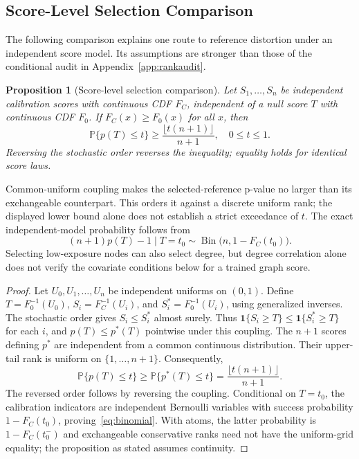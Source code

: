 \documentclass[twoside]{article}
\newtheorem{proposition}{Proposition}
\newcommand{\Prb}{\mathbb{P}}
\newcommand{\ind}{\mathbf{1}}
\begin{document}
\subsection{Score-Level Selection Comparison}
The following comparison explains one route to reference distortion under an independent score model. Its assumptions are stronger than those of the conditional audit in Appendix~\ref{app:rankaudit}.
\begin{proposition}[Score-level selection comparison]
\label{prop:order}
Let $S_1,\ldots,S_n$ be independent calibration scores with continuous CDF $F_C$, independent of a null score $T$ with continuous CDF $F_0$. If $F_C(x)\ge F_0(x)$ for all $x$, then
\begin{equation}
\Prb\{p(T)\le t\}\ge\frac{\lfloor t(n+1)\rfloor}{n+1},\quad 0\le t\le1.
\label{eq:order}
\end{equation}
Reversing the stochastic order reverses the inequality; equality holds for identical score laws.
\end{proposition}
Common-uniform coupling makes the selected-reference p-value no larger than its exchangeable counterpart. This orders it against a discrete uniform rank; the displayed lower bound alone does not establish a strict exceedance of $t$. The exact independent-model probability follows from
\begin{equation}
(n+1)p(T)-1\mid T=t_0\sim\operatorname{Bin}\bigl(n,1-F_C(t_0)\bigr).
\label{eq:binomial}
\end{equation}
Selecting low-exposure nodes can also select degree, but degree correlation alone does not verify the covariate conditions below for a trained graph score.

\begin{proof}
Let $U_0,U_1,\ldots,U_n$ be independent uniforms on $(0,1)$. Define $T=F_0^{-1}(U_0)$, $S_i=F_C^{-1}(U_i)$, and $S_i^*=F_0^{-1}(U_i)$, using generalized inverses. The stochastic order gives $S_i\le S_i^*$ almost surely. Thus $\ind\{S_i\ge T\}\le\ind\{S_i^*\ge T\}$ for each $i$, and $p(T)\le p^*(T)$ pointwise under this coupling. The $n+1$ scores defining $p^*$ are independent from a common continuous distribution. Their upper-tail rank is uniform on $\{1,\ldots,n+1\}$. Consequently,
\[
 \Prb\{p(T)\le t\}\ge\Prb\{p^*(T)\le t\}
 =\frac{\lfloor t(n+1)\rfloor}{n+1}.
\]
The reversed order follows by reversing the coupling. Conditional on $T=t_0$, the calibration indicators are independent Bernoulli variables with success probability $1-F_C(t_0)$, proving~\eqref{eq:binomial}. With atoms, the latter probability is $1-F_C(t_0^-)$ and exchangeable conservative ranks need not have the uniform-grid equality; the proposition as stated assumes continuity.
\end{proof}
\end{document}
